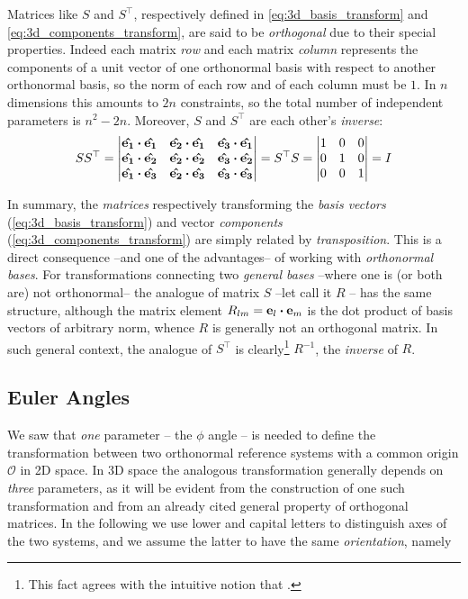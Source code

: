 Matrices like $S$ and $S^\top$, respectively defined in \ref{eq:3d_basis_transform} and \ref{eq:3d_components_transform}, are said to be \textit{orthogonal} due to their special properties. 
Indeed each matrix \textit{row} and each matrix \textit{column} represents the components of a unit vector of one orthonormal basis with respect to another orthonormal basis, so the norm of each row and of each column must be $1$. In $n$ dimensions this amounts to $2n$ constraints, so the total number of independent parameters is $n^2-2n$. Moreover, $S$ and $S^\top$ are each other's \textit{inverse}:
\begin{equation}
S S^\top = \mqty|
\vu{e_1} \vdot \vu{e_1} & \vu{e_2} \vdot \vu{e_1}  & \vu{e_3} \vdot \vu{e_1} \\  
\vu{e_1} \vdot \vu{e_2} & \vu{e_2} \vdot \vu{e_2}  & \vu{e_3} \vdot \vu{e_2} \\  
\vu{e_1} \vdot \vu{e_3} & \vu{e_2} \vdot \vu{e_3}  & \vu{e_3} \vdot \vu{e_3} |  = S^\top S
= \mqty|
1 & 0 & 0 \\
0 & 1 & 0 \\
0 & 0 & 1 | = I 
\label{eq:3d_ortho_matrices}
\end{equation}

In summary, the \textit{matrices} respectively transforming the \textit{basis vectors} (\ref{eq:3d_basis_transform}) and vector \textit{components} (\ref{eq:3d_components_transform}) are simply related by \textit{transposition}. This is a direct consequence --and one of the advantages-- of working with \textit{orthonormal bases}. For transformations connecting two \textit{general bases} --where one is (or both are) not orthonormal-- the analogue of matrix $S$ --let call it $R$ --  has the same structure, although the matrix element $R_{lm} = \vb{e}_l \vdot \vb{e}_m$ is the dot product of basis vectors of arbitrary norm, whence $R$ is generally not an orthogonal matrix. In such general context, the analogue of $S^\top$ is clearly\footnote{This fact agrees with the intuitive notion that .} $R^{-1}$, the \textit{inverse} of $R$. 

\subsection{Euler Angles}
We saw that \textit{one} parameter -- the $\phi$ angle -- is needed to define the transformation between two orthonormal reference systems with a common origin $\mathcal{O}$ in 2D space. In 3D space the analogous transformation generally depends on \textit{three} parameters, as it will be evident from the construction of one such transformation and from an already cited general property of orthogonal matrices. 
In the following we use lower and capital letters to distinguish axes of the two systems, and we assume the latter to have the same \textit{orientation}, namely 

